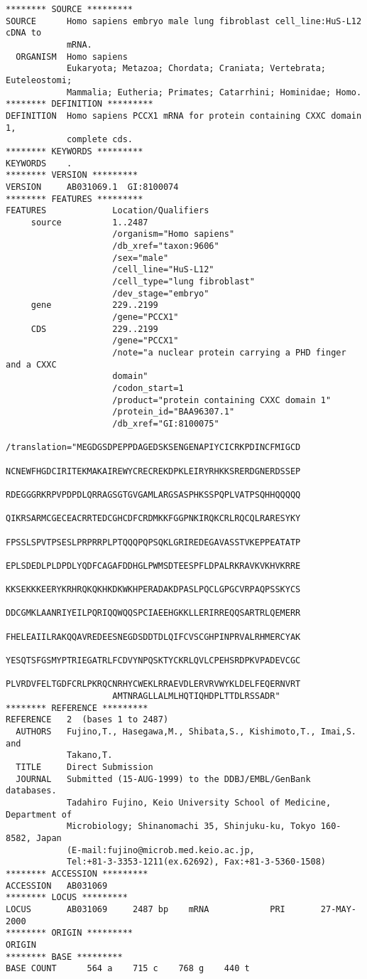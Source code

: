\begin{lstlisting}[language={},basicstyle=\small\tt,breaklines=false]
******** SOURCE *********
SOURCE      Homo sapiens embryo male lung fibroblast cell_line:HuS-L12 cDNA to
            mRNA.
  ORGANISM  Homo sapiens
            Eukaryota; Metazoa; Chordata; Craniata; Vertebrata; Euteleostomi;
            Mammalia; Eutheria; Primates; Catarrhini; Hominidae; Homo.
******** DEFINITION *********
DEFINITION  Homo sapiens PCCX1 mRNA for protein containing CXXC domain 1,
            complete cds.
******** KEYWORDS *********
KEYWORDS    .
******** VERSION *********
VERSION     AB031069.1  GI:8100074
******** FEATURES *********
FEATURES             Location/Qualifiers
     source          1..2487
                     /organism="Homo sapiens"
                     /db_xref="taxon:9606"
                     /sex="male"
                     /cell_line="HuS-L12"
                     /cell_type="lung fibroblast"
                     /dev_stage="embryo"
     gene            229..2199
                     /gene="PCCX1"
     CDS             229..2199
                     /gene="PCCX1"
                     /note="a nuclear protein carrying a PHD finger and a CXXC
                     domain"
                     /codon_start=1
                     /product="protein containing CXXC domain 1"
                     /protein_id="BAA96307.1"
                     /db_xref="GI:8100075"
                     /translation="MEGDGSDPEPPDAGEDSKSENGENAPIYCICRKPDINCFMIGCD
                     NCNEWFHGDCIRITEKMAKAIREWYCRECREKDPKLEIRYRHKKSRERDGNERDSSEP
                     RDEGGGRKRPVPDPDLQRRAGSGTGVGAMLARGSASPHKSSPQPLVATPSQHHQQQQQ
                     QIKRSARMCGECEACRRTEDCGHCDFCRDMKKFGGPNKIRQKCRLRQCQLRARESYKY
                     FPSSLSPVTPSESLPRPRRPLPTQQQPQPSQKLGRIREDEGAVASSTVKEPPEATATP
                     EPLSDEDLPLDPDLYQDFCAGAFDDHGLPWMSDTEESPFLDPALRKRAVKVKHVKRRE
                     KKSEKKKEERYKRHRQKQKHKDKWKHPERADAKDPASLPQCLGPGCVRPAQPSSKYCS
                     DDCGMKLAANRIYEILPQRIQQWQQSPCIAEEHGKKLLERIRREQQSARTRLQEMERR
                     FHELEAIILRAKQQAVREDEESNEGDSDDTDLQIFCVSCGHPINPRVALRHMERCYAK
                     YESQTSFGSMYPTRIEGATRLFCDVYNPQSKTYCKRLQVLCPEHSRDPKVPADEVCGC
                     PLVRDVFELTGDFCRLPKRQCNRHYCWEKLRRAEVDLERVRVWYKLDELFEQERNVRT
                     AMTNRAGLLALMLHQTIQHDPLTTDLRSSADR"
******** REFERENCE *********
REFERENCE   2  (bases 1 to 2487)
  AUTHORS   Fujino,T., Hasegawa,M., Shibata,S., Kishimoto,T., Imai,S. and
            Takano,T.
  TITLE     Direct Submission
  JOURNAL   Submitted (15-AUG-1999) to the DDBJ/EMBL/GenBank databases.
            Tadahiro Fujino, Keio University School of Medicine, Department of
            Microbiology; Shinanomachi 35, Shinjuku-ku, Tokyo 160-8582, Japan
            (E-mail:fujino@microb.med.keio.ac.jp,
            Tel:+81-3-3353-1211(ex.62692), Fax:+81-3-5360-1508)
******** ACCESSION *********
ACCESSION   AB031069
******** LOCUS *********
LOCUS       AB031069     2487 bp    mRNA            PRI       27-MAY-2000
******** ORIGIN *********
ORIGIN      
******** BASE *********
BASE COUNT      564 a    715 c    768 g    440 t
\end{lstlisting}

